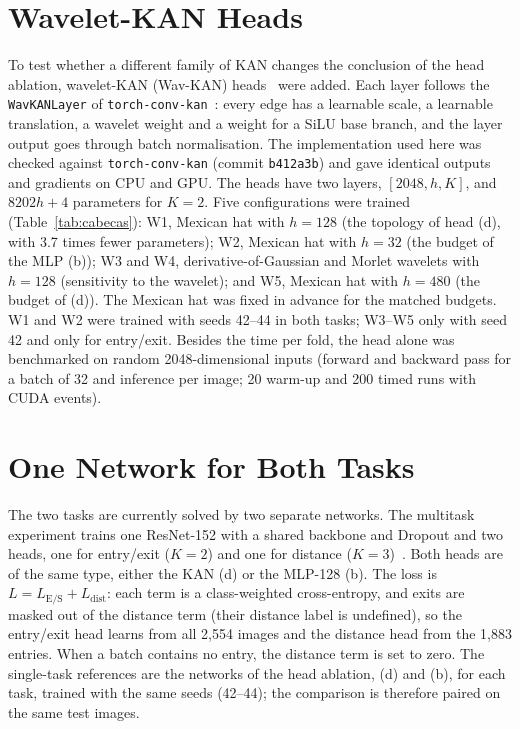 \section{Wavelet-KAN Heads}
\label{sec:wavkan_setup}

To test whether a different family of KAN changes the conclusion of the head ablation, wavelet-KAN (Wav-KAN) heads~\cite{bozorgasl2024wavkan} were added. Each layer follows the \texttt{WavKANLayer} of \texttt{torch-conv-kan}~\cite{drokin2024torchconvkan}: every edge has a learnable scale, a learnable translation, a wavelet weight and a weight for a SiLU base branch, and the layer output goes through batch normalisation. The implementation used here was checked against \texttt{torch-conv-kan} (commit \texttt{b412a3b}) and gave identical outputs and gradients on CPU and GPU. The heads have two layers, $[2048, h, K]$, and $8202h + 4$ parameters for $K=2$. Five configurations were trained (Table~\ref{tab:cabecas}): W1, Mexican hat with $h=128$ (the topology of head (d), with 3.7 times fewer parameters); W2, Mexican hat with $h=32$ (the budget of the MLP (b)); W3 and W4, derivative-of-Gaussian and Morlet wavelets with $h=128$ (sensitivity to the wavelet); and W5, Mexican hat with $h=480$ (the budget of (d)). The Mexican hat was fixed in advance for the matched budgets. W1 and W2 were trained with seeds 42--44 in both tasks; W3--W5 only with seed 42 and only for entry/exit. Besides the time per fold, the head alone was benchmarked on random 2048-dimensional inputs (forward and backward pass for a batch of 32 and inference per image; 20 warm-up and 200 timed runs with CUDA events).

\section{One Network for Both Tasks}
\label{sec:mt_setup}

The two tasks are currently solved by two separate networks. The multitask experiment trains one ResNet-152 with a shared backbone and Dropout and two heads, one for entry/exit ($K=2$) and one for distance ($K=3$)~\cite{caruana1997multitask,ruder2017overview}. Both heads are of the same type, either the KAN (d) or the MLP-128 (b). The loss is $L = L_{\mathrm{E/S}} + L_{\mathrm{dist}}$: each term is a class-weighted cross-entropy, and exits are masked out of the distance term (their distance label is undefined), so the entry/exit head learns from all 2,554 images and the distance head from the 1,883 entries. When a batch contains no entry, the distance term is set to zero. The single-task references are the networks of the head ablation, (d) and (b), for each task, trained with the same seeds (42--44); the comparison is therefore paired on the same test images.

